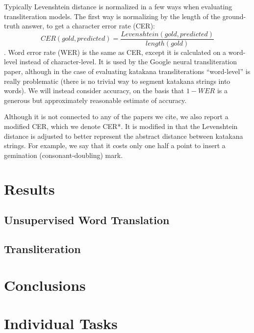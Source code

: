 \documentclass{article}
\begin{document}
Typically Levenshtein distance is normalized in a few ways
when evaluating transliteration models.
The first way is normalizing by the length of the ground-truth answer,
to get a character error rate (CER):
$$CER(gold, predicted) = \frac{Levenshtein(gold, predicted)}{length(gold)}$$.
Word error rate (WER) is the same as CER,
except it is calculated on a word-level instead of character-level.
It is used by the Google neural transliteration paper,
although in the case of evaluating katakana transliterations
``word-level'' is really problematic
(there is no trivial way to segment katakana strings into words).
We will instead consider accuracy,
on the basis that $1 - WER$
is a generous but approximately reasonable estimate of accuracy.

Although it is not connected to any of the papers we cite,
we also report a modified CER,
which we denote CER*.
It is modified in that the Levenshtein distance
is adjusted to better represent the abstract distance between katakana strings.
For example,
we say that it costs only one half a point
to insert a gemination (consonant-doubling) mark.

\section*{Results}

\subsection*{Unsupervised Word Translation}

\subsection*{Transliteration}

\section*{Conclusions}

\section*{Individual Tasks}

{}

\end{document}
